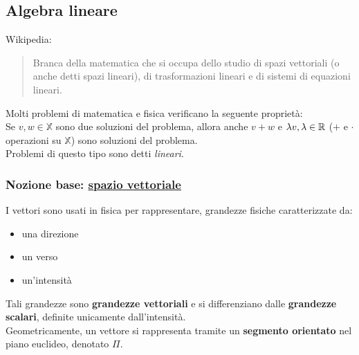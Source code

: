 \documentclass{article}
\begin{document}
\subsection*{Algebra lineare}
Wikipedia:
\begin{quotation}
	Branca della matematica che si occupa dello studio di spazi vettoriali (o anche detti spazi lineari), di trasformazioni lineari e di sistemi di equazioni lineari.
\end{quotation}
Molti problemi di matematica e fisica verificano la seguente proprietà:\\
Se $v,w\in\mathbb{X}$ sono due soluzioni del problema, allora anche $v+w$ e $\lambda v,\lambda\in\mathbb{R}$  ($+$ e $\cdot$ operazioni su $\mathbb{X}$) sono soluzioni del problema.\\
Problemi di questo tipo sono detti \textit{lineari}.

\subsubsection*{Nozione base: \ul{spazio vettoriale}}

I vettori sono usati in fisica per rappresentare, grandezze fisiche caratterizzate da:
\begin{itemize}
	\item una direzione
	\item un verso
	\item un'intensità
\end{itemize}
Tali grandezze sono \textbf{grandezze vettoriali} e si differenziano dalle \textbf{grandezze scalari}, definite unicamente dall'intensità.\\
Geometricamente, un vettore si rappresenta tramite un \textbf{segmento orientato} nel piano euclideo, denotato $\Pi$.
\end{document}
